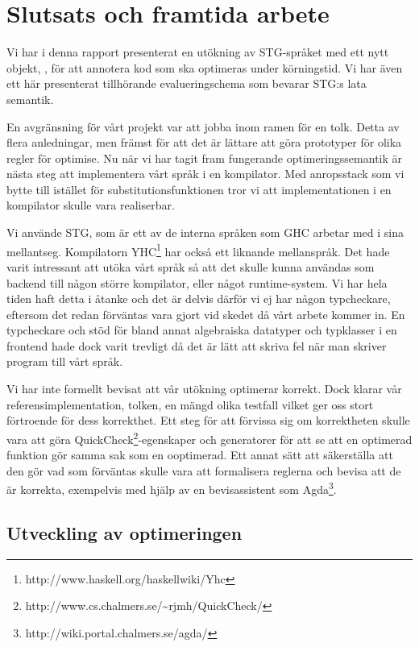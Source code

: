 \documentclass[Rapport]{subfiles}
\begin{document}
\chapter{Slutsats och framtida arbete}

Vi har i denna rapport presenterat en utökning av STG-språket med ett nytt objekt, , för att annotera kod som ska optimeras under körningstid. Vi har även ett här presenterat tillhörande evalueringschema som bevarar STG:s lata semantik. 

En avgränsning för vårt projekt var att jobba inom ramen för en tolk. 
Detta av flera anledningar, men främst för att det är lättare att göra prototyper för 
olika regler för optimise. Nu när vi har tagit fram fungerande optimeringssemantik 
är nästa steg att implementera vårt språk i en kompilator.
Med anropsstack som vi bytte till istället för substitutionsfunktionen tror vi att implementationen
i en kompilator skulle vara realiserbar.


Vi använde STG, som är ett av de interna språken som GHC arbetar med i sina
mellantseg. Kompilatorn YHC\footnote{http://www.haskell.org/haskellwiki/Yhc} 
har också ett liknande mellanspråk.
Det hade varit intressant att utöka vårt språk så att det skulle kunna 
användas som backend till någon större kompilator, eller något runtime-system.
Vi har hela tiden haft detta i åtanke och det är delvis därför vi ej har någon 
typcheckare, eftersom det redan förväntas vara gjort vid skedet då vårt arbete kommer in.
En typcheckare och stöd för bland annat algebraiska datatyper och typklasser i en 
frontend hade dock varit trevligt då det är lätt att skriva fel när man skriver
program till vårt språk. 


Vi har inte formellt bevisat att vår utökning optimerar korrekt. Dock klarar vår 
referensimplementation, tolken, en mängd olika testfall vilket ger oss stort förtroende för 
dess korrekthet.
Ett steg för att förvissa sig om korrektheten skulle vara att göra 
QuickCheck\footnote{http://www.cs.chalmers.se/\textasciitilde rjmh/QuickCheck/}-egenskaper 
och generatorer för att se att en optimerad funktion gör samma sak som en ooptimerad. 
Ett annat sätt att säkerställa att den
gör vad som förväntas skulle vara att formalisera reglerna och bevisa
att de är korrekta, exempelvis med hjälp av en bevisassistent som 
Agda\footnote{http://wiki.portal.chalmers.se/agda/}.

\section{Utveckling av optimeringen}
\end{document}
